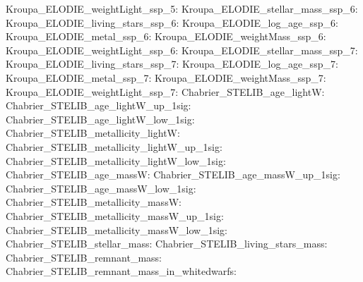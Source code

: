 Kroupa\_ELODIE\_weightLight\_ssp\_5:  \newline 
Kroupa\_ELODIE\_stellar\_mass\_ssp\_6:  \newline 
Kroupa\_ELODIE\_living\_stars\_ssp\_6:  \newline 
Kroupa\_ELODIE\_log\_age\_ssp\_6:  \newline 
Kroupa\_ELODIE\_metal\_ssp\_6:  \newline 
Kroupa\_ELODIE\_weightMass\_ssp\_6:  \newline 
Kroupa\_ELODIE\_weightLight\_ssp\_6:  \newline 
Kroupa\_ELODIE\_stellar\_mass\_ssp\_7:  \newline 
Kroupa\_ELODIE\_living\_stars\_ssp\_7:  \newline 
Kroupa\_ELODIE\_log\_age\_ssp\_7:  \newline 
Kroupa\_ELODIE\_metal\_ssp\_7:  \newline 
Kroupa\_ELODIE\_weightMass\_ssp\_7:  \newline 
Kroupa\_ELODIE\_weightLight\_ssp\_7:  \newline 
Chabrier\_STELIB\_age\_lightW:  \newline 
Chabrier\_STELIB\_age\_lightW\_up\_1sig:  \newline 
Chabrier\_STELIB\_age\_lightW\_low\_1sig:  \newline 
Chabrier\_STELIB\_metallicity\_lightW:  \newline 
Chabrier\_STELIB\_metallicity\_lightW\_up\_1sig:  \newline 
Chabrier\_STELIB\_metallicity\_lightW\_low\_1sig:  \newline 
Chabrier\_STELIB\_age\_massW:  \newline 
Chabrier\_STELIB\_age\_massW\_up\_1sig:  \newline 
Chabrier\_STELIB\_age\_massW\_low\_1sig:  \newline 
Chabrier\_STELIB\_metallicity\_massW:  \newline 
Chabrier\_STELIB\_metallicity\_massW\_up\_1sig:  \newline 
Chabrier\_STELIB\_metallicity\_massW\_low\_1sig:  \newline 
Chabrier\_STELIB\_stellar\_mass:  \newline 
Chabrier\_STELIB\_living\_stars\_mass:  \newline 
Chabrier\_STELIB\_remnant\_mass:  \newline 
Chabrier\_STELIB\_remnant\_mass\_in\_whitedwarfs:  \newline 
